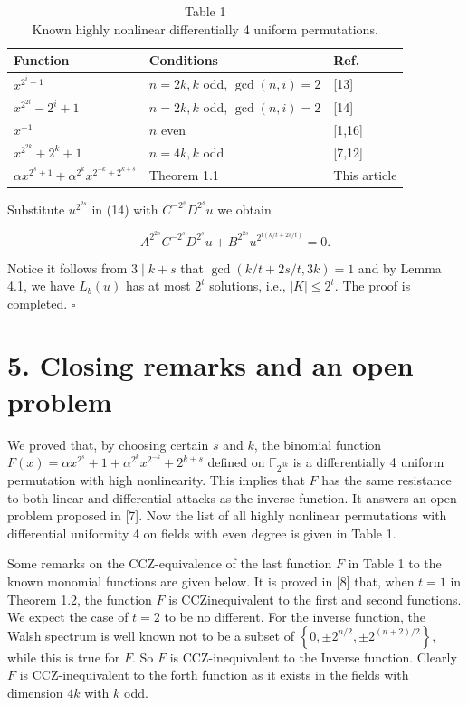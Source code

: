 \documentclass[10pt]{article}
\begin{document}
\begin{table}[h]
\begin{center}
\captionsetup{labelformat=empty}
\caption{Table 1\\
Known highly nonlinear differentially 4 uniform permutations.}
\begin{tabular}{|l|l|l|}
\hline
Function & Conditions & Ref. \\
\hline
$x^{2^{i}+1}$ & $n=2 k, k$ odd, $\operatorname{gcd}(n, i)=2$ & [13] \\
\hline
$x^{2^{2 i}}-2^{i}+1$ & $n=2 k, k$ odd, $\operatorname{gcd}(n, i)=2$ & [14] \\
\hline
$x^{-1}$ & $n$ even & [1,16] \\
\hline
$x^{2^{2 k}}+2^{k}+1$ & $n=4 k, k$ odd & [7,12] \\
\hline
$\alpha x^{2^{s}+1}+\alpha^{2^{k}} x^{2^{-k}+2^{k+s}}$ & Theorem 1.1 & This article \\
\hline
\end{tabular}
\end{center}
\end{table}

Substitute $u^{2^{2 s}}$ in (14) with $C^{-2^{s}} D^{2^{s}} u$ we obtain


\begin{equation*}
A^{2^{2 s}} C^{-2^{s}} D^{2^{s}} u+B^{2^{2 s}} u^{2^{t(k / t+2 s / t)}}=0 . \tag{16}
\end{equation*}


Notice it follows from $3 \mid k+s$ that $\operatorname{gcd}(k / t+2 s / t, 3 k)=1$ and by Lemma 4.1, we have $L_{b}(u)$ has at most $2^{t}$ solutions, i.e., $|K| \leqslant 2^{t}$. The proof is completed. \(\square\)

\section*{5. Closing remarks and an open problem}
We proved that, by choosing certain $s$ and $k$, the binomial function $F(x)=\alpha x^{2^{s}}+1+\alpha^{2^{k}} x^{2^{-k}}+2^{k+s}$ defined on $\mathbb{F}_{2^{3 k}}$ is a differentially 4 uniform permutation with high nonlinearity. This implies that $F$ has the same resistance to both linear and differential attacks as the inverse function. It answers an open problem proposed in [7]. Now the list of all highly nonlinear permutations with differential uniformity 4 on fields with even degree is given in Table 1.

Some remarks on the CCZ-equivalence of the last function $F$ in Table 1 to the known monomial functions are given below. It is proved in [8] that, when $t=1$ in Theorem 1.2, the function $F$ is CCZinequivalent to the first and second functions. We expect the case of $t=2$ to be no different. For the inverse function, the Walsh spectrum is well known not to be a subset of $\left\{0, \pm 2^{n / 2}, \pm 2^{(n+2) / 2}\right\}$, while this is true for $F$. So $F$ is CCZ-inequivalent to the Inverse function. Clearly $F$ is CCZ-inequivalent to the forth function as it exists in the fields with dimension $4 k$ with $k$ odd.
\end{document}
